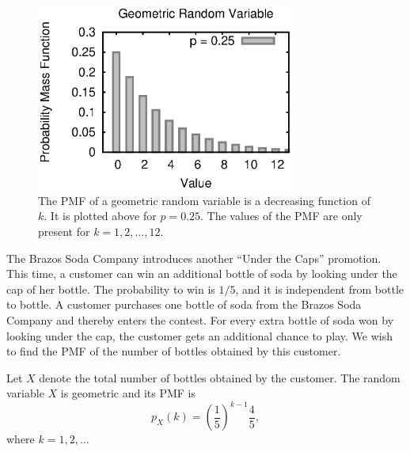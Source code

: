 \begin{figure}[ht]
\begin{center}
\includegraphics[width=8.5cm]{Figures/5chapter/geometric_pmf}
\end{center}
\caption{The PMF of a geometric random variable is a decreasing function of $k$.
It is plotted above for $p = 0.25$.
The values of the PMF are only present for $k = 1, 2, \ldots, 12$.}
\end{figure}

\begin{example}
The Brazos Soda Company introduces another ``Under the Caps'' promotion.
This time, a customer can win an additional bottle of soda by looking under the cap of her bottle.
The probability to win is $1/5$, and it is independent from bottle to bottle.
A customer purchases one bottle of soda from the Brazos Soda Company and thereby enters the contest.
For every extra bottle of soda won by looking under the cap, the customer gets an additional chance to play.
We wish to find the PMF of the number of bottles obtained by this customer.

Let $X$ denote the total number of bottles obtained by the customer.
The random variable $X$ is geometric and its PMF is
\begin{equation*}
p_X (k) = \left( \frac{1}{5} \right)^{k-1} \frac{4}{5},
\end{equation*}
where $k = 1, 2, \ldots$
\end{example}


